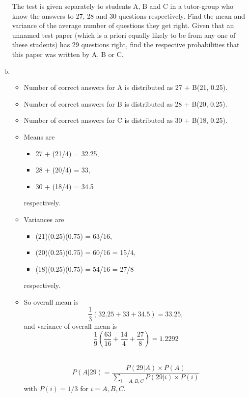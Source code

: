 \documentclass[a4paper,12pt]{article}
\begin{document}
\begin{enumerate}[(a)]
\newpage

\begin{framed}
The test is given separately to students A, B and C in a tutor-group who know
the answers to 27, 28 and 30 questions respectively. Find the mean and
variance of the average number of questions they get right. Given that an
unnamed test paper (which is a priori equally likely to be from any one of
these students) has 29 questions right, find the respective probabilities that this
paper was written by A, B or C.

\end{framed}

\item 
\begin{itemize}
\item Number of correct answers for A is distributed as 27 + B(21, 0.25).
\item Number of correct answers for B is distributed as 28 + B(20, 0.25).
\item Number of correct answers for C is distributed as 30 + B(18, 0.25).
\end{itemize}
\begin{itemize}
\item Means are 
\begin{itemize}
\item 27 + (21/4) = 32.25, 
\item 28 + (20/4) = 33, 
\item 30 + (18/4) = 34.5
\end{itemize}  
respectively.

\item  Variances are 
\begin{itemize}
\item (21)(0.25)(0.75) = 63/16, 
\item (20)(0.25)(0.75) = 60/16 = 15/4, 
\item (18)(0.25)(0.75) = 54/16 = 27/8 
\end{itemize}  
  respectively.
 
\item So overall mean is 
\[ \frac{1}{3}  (32.25 + 33  + 34.5) = 33.25,\]
and variance of overall mean is 
\[ \frac{1}{9}  (\frac{63}{16} + \frac{14}{4}  + \frac{27}{8}) = 1.2292\] 



\[ P(A|29) = \frac{P(29|A) \times P(A)}{ \sum_{i=A,B,C} P(29|i) \times P(i)}\]
with $P(i) = 1/3$ for $i = A,B,C$.



\end{itemize}
\end{enumerate}
\end{document}
